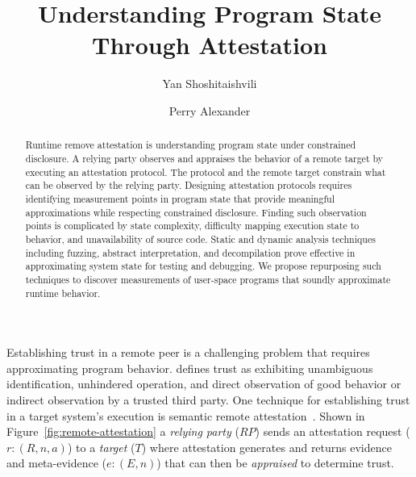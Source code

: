 \documentclass[runningheads]{llncs}
\begin{document}
%
\title{Understanding Program State Through Attestation}
%
%
\author{Yan Shoshitaishvili \and Perry Alexander}
%
%
%
\maketitle              %
%
\begin{abstract}
Runtime remove attestation is understanding program state under constrained
disclosure. A relying party observes and appraises the behavior of a
remote target by executing an attestation protocol. The protocol and the remote
target constrain what can be observed by the relying party.  Designing
attestation protocols requires identifying measurement points in program state
that provide meaningful approximations  while respecting constrained disclosure.
Finding such observation points is complicated by state complexity, difficulty
mapping execution state to behavior, and unavailability of source code.  Static
and dynamic analysis techniques including fuzzing, abstract
interpretation, and decompilation prove effective in approximating system state
for testing and debugging.  We propose repurposing such techniques to discover
measurements of user-space programs that soundly approximate runtime behavior.

\end{abstract}
%
%
%


Establishing trust in a remote peer is a challenging problem that requires
approximating program behavior. \citet{Martin:08:The-ten-page-in} defines trust
as exhibiting unambiguous identification, unhindered operation, and direct
observation of good behavior or indirect observation by a trusted third party.
One technique for establishing trust in a target system's execution is semantic
remote attestation~\citep{Haldar:04:Semantic-Remote,Coker::Principles-of-R}.
Shown in Figure~\ref{fig:remote-attestation} a \emph{relying party} ($RP$) sends
an attestation request ($r:(R,n,a)$) to a \emph{target} ($T$) where attestation
generates and returns evidence and meta-evidence ($e:(E,n)$) that can then be \emph{appraised} to determine trust.
\end{document}
